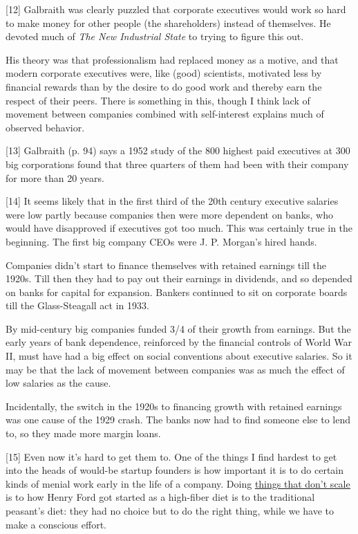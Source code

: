 [12]
Galbraith was clearly puzzled that corporate executives would
work so hard to make money for other people (the shareholders)
instead of themselves.  He devoted much of \emph{The New Industrial
State} to trying to figure this out.

His theory was that professionalism had replaced money as a motive,
and that modern corporate executives were, like (good) scientists,
motivated less by financial rewards than by the desire to do good
work and thereby earn the respect of their peers.  There is something
in this, though I think lack of movement between companies combined
with self-interest explains much of observed behavior.

[13]
Galbraith (p. 94) says a 1952 study of the 800 highest paid
executives at 300 big corporations found that three quarters of
them had been with their company for more than 20 years.

[14]
It seems likely that in the first third of the 20th century
executive salaries were low partly because companies then were more
dependent on banks, who would have disapproved if executives got
too much.  This was certainly true in the beginning. The first big
company CEOs were J. P. Morgan's hired hands.

Companies didn't start to finance themselves with retained earnings
till the 1920s.  Till then they had to pay out their earnings in
dividends, and so depended on banks for capital for expansion.
Bankers continued to sit on corporate boards till the Glass-Steagall
act in 1933.

By mid-century big companies funded 3/4 of their growth from earnings.
But the early years of bank dependence, reinforced by the financial
controls of World War II, must have had a big effect on social
conventions about executive salaries.  So it may be that the lack
of movement between companies was as much the effect of low salaries
as the cause.

Incidentally, the switch in the 1920s to financing growth with
retained earnings was one cause of the 1929 crash.  The banks now
had to find someone else to lend to, so they made more margin loans.

[15]
Even now it's hard to get them to. One of the things I find
hardest to get into the heads of would-be startup founders is how
important it is to do certain kinds of menial work early in the
life of a company.  Doing \href{http://www.paulgraham.com/ds.html}{\underline{things that don't
scale}} is to how Henry Ford got started as a high-fiber diet is
to the traditional peasant's diet: they had no choice but to do the
right thing, while we have to make a conscious effort.

